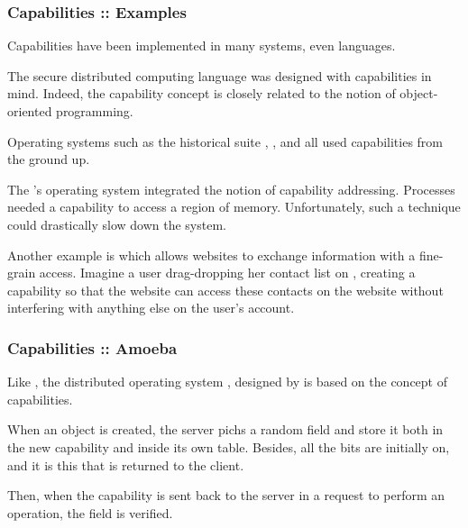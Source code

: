 
\begin{frame}
  \frametitle{Capabilities :: Examples}

  Capabilities have been implemented in many systems, even languages.

  \-

  The secure distributed computing language  was designed with
  capabilities in mind. Indeed, the capability concept is closely related
  to the notion of object-oriented programming.

  \-

  Operating systems such as the historical suite , ,
   and  all used capabilities from the ground up.

  \-

  The 's operating system  integrated the notion
  of capability addressing. Processes needed a capability to access a region
  of memory. Unfortunately, such a technique could drastically slow down the
  system.

  \-

  Another example is   which allows websites to
  exchange information with a fine-grain access. Imagine a user drag-dropping
  her  contact list on , creating a capability
  so that the  website can access these contacts on the
   website without interfering with anything else on the user's
   account.
\end{frame}


\begin{frame}
  \frametitle{Capabilities :: Amoeba}

  Like , the distributed operating system , designed
  by   is based on the concept of
  capabilities.

  \-

  \begin{center}
  \end{center}

  \-

  When an object is created, the server pichs a random  field and
  store it both in the new capability and inside its own table. Besides,
  all the  bits are initially on, and it is this  that is returned to the client.

  \-
  
  Then, when the capability is sent back to the server in a request to perform
  an operation, the  field is verified.
\end{frame}

